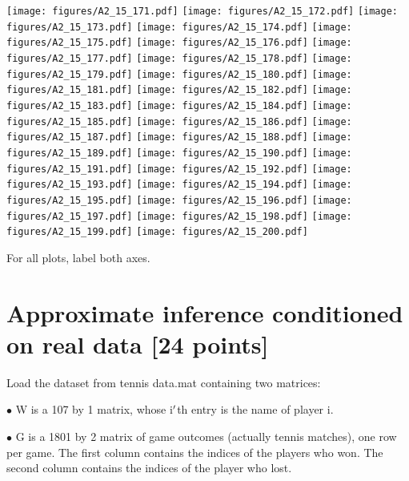 \documentclass[12pt,a4paper]{article}
\begin{document}
\texttt{[image: figures/A2\_15\_171.pdf]}
\texttt{[image: figures/A2\_15\_172.pdf]}
\texttt{[image: figures/A2\_15\_173.pdf]}
\texttt{[image: figures/A2\_15\_174.pdf]}
\texttt{[image: figures/A2\_15\_175.pdf]}
\texttt{[image: figures/A2\_15\_176.pdf]}
\texttt{[image: figures/A2\_15\_177.pdf]}
\texttt{[image: figures/A2\_15\_178.pdf]}
\texttt{[image: figures/A2\_15\_179.pdf]}
\texttt{[image: figures/A2\_15\_180.pdf]}
\texttt{[image: figures/A2\_15\_181.pdf]}
\texttt{[image: figures/A2\_15\_182.pdf]}
\texttt{[image: figures/A2\_15\_183.pdf]}
\texttt{[image: figures/A2\_15\_184.pdf]}
\texttt{[image: figures/A2\_15\_185.pdf]}
\texttt{[image: figures/A2\_15\_186.pdf]}
\texttt{[image: figures/A2\_15\_187.pdf]}
\texttt{[image: figures/A2\_15\_188.pdf]}
\texttt{[image: figures/A2\_15\_189.pdf]}
\texttt{[image: figures/A2\_15\_190.pdf]}
\texttt{[image: figures/A2\_15\_191.pdf]}
\texttt{[image: figures/A2\_15\_192.pdf]}
\texttt{[image: figures/A2\_15\_193.pdf]}
\texttt{[image: figures/A2\_15\_194.pdf]}
\texttt{[image: figures/A2\_15\_195.pdf]}
\texttt{[image: figures/A2\_15\_196.pdf]}
\texttt{[image: figures/A2\_15\_197.pdf]}
\texttt{[image: figures/A2\_15\_198.pdf]}
\texttt{[image: figures/A2\_15\_199.pdf]}
\texttt{[image: figures/A2\_15\_200.pdf]}

For all plots, label both axes.

\section{Approximate inference conditioned on real data [24 points]}
Load the dataset from tennis data.mat containing two matrices:

\ensuremath{\bullet} W is a 107 by 1 matrix, whose i\ensuremath{\rq}th entry is the name of player i.

\ensuremath{\bullet} G is a 1801 by 2 matrix of game outcomes (actually tennis matches), one row per game. The first column contains the indices of the players who won. The second column contains the indices of the player who lost.
\end{document}
